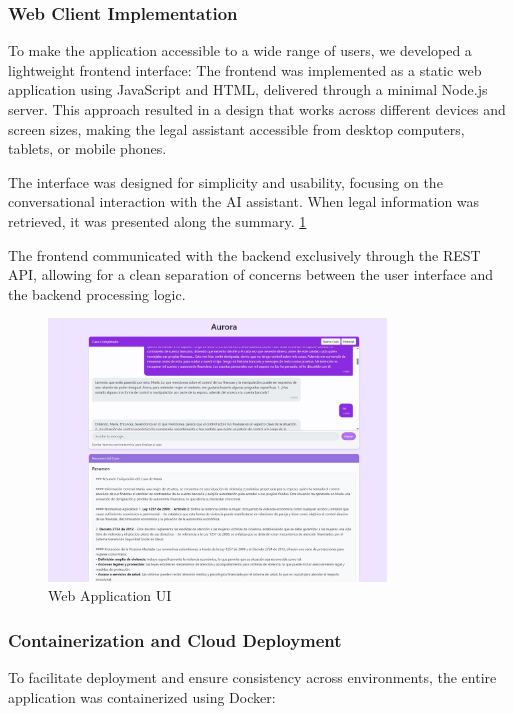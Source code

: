 \subsubsection{Web Client Implementation}

To make the application accessible to a wide range of users, we developed a lightweight frontend interface:
The frontend was implemented as a static web application using JavaScript and HTML, delivered through a minimal Node.js server. This approach resulted in a design that works across different devices and screen sizes, making the legal assistant accessible from desktop computers, tablets, or mobile phones.

The interface was designed for simplicity and usability, focusing on the conversational interaction with the AI assistant. 
When legal information was retrieved, it was presented along the summary. \ref{fig:Frontend}

The frontend communicated with the backend exclusively through the REST API, allowing for a clean separation of concerns between 
the user interface and the backend processing logic.

\begin{figure}[htbp]
    \centering
    \includegraphics[width=0.8\textwidth]{figures/Frontend.jpeg}
    \caption{Web Application UI}
    \label{fig:Frontend}
\end{figure}

\subsubsection{Containerization and Cloud Deployment}

To facilitate deployment and ensure consistency across environments, the entire application was containerized using Docker:

